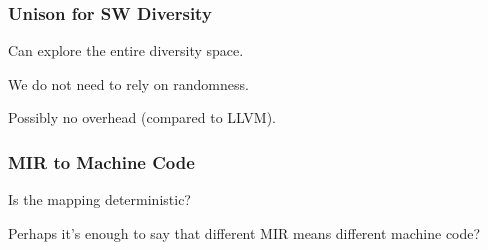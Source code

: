 \documentclass{beamer}
\begin{document}








\begin{frame}
	\frametitle{Unison for SW Diversity}

	Can explore the entire diversity space.

	\vspace{0.5cm}

	We do not need to rely on randomness.

	\vspace{0.5cm}

	Possibly no overhead (compared to LLVM).
\end{frame}

\begin{frame}
	\frametitle{MIR to Machine Code}

	Is the mapping deterministic?

	\vspace{0.5cm}

	Perhaps it's enough to say that different MIR means different machine code?
\end{frame}
\end{document}
